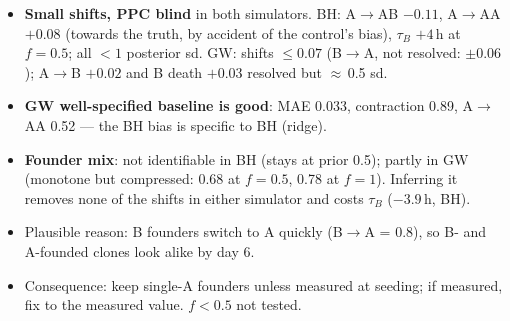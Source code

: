 \documentclass[10pt,a4paper]{article}
\newcommand{\tB}{$\tau_B$}
\begin{document}
\begin{itemize}
\item \textbf{Small shifts, PPC blind} in both simulators. BH: A$\to$AB $-0.11$, A$\to$AA $+0.08$ (towards the truth, by accident of the control's bias), \tB{} $+4$\,h at $f=0.5$; all $<1$ posterior sd. GW: shifts $\le 0.07$ (B$\to$A, not resolved: $\pm 0.06$); A$\to$B $+0.02$ and B death $+0.03$ resolved but $\approx$\,0.5 sd.
\item \textbf{GW well-specified baseline is good}: MAE 0.033, contraction 0.89, A$\to$AA 0.52 --- the BH bias is specific to BH (ridge).
\item \textbf{Founder mix}: not identifiable in BH (stays at prior 0.5); partly in GW (monotone but compressed: 0.68 at $f=0.5$, 0.78 at $f=1$). Inferring it removes none of the shifts in either simulator and costs \tB{} ($-3.9$\,h, BH).
\item Plausible reason: B founders switch to A quickly (B$\to$A = 0.8), so B- and A-founded clones look alike by day 6.
\item Consequence: keep single-A founders unless measured at seeding; if measured, fix to the measured value. $f<0.5$ not tested.
\end{itemize}

\end{document}
